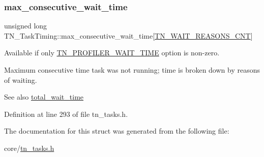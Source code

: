 \subsubsection{\texorpdfstring{max\+\_\+consecutive\+\_\+wait\+\_\+time}{max\_consecutive\_wait\_time}}
{\footnotesize\ttfamily unsigned long T\+N\+\_\+\+Task\+Timing\+::max\+\_\+consecutive\+\_\+wait\+\_\+time\mbox{[}\hyperlink{tn__tasks_8h_a343b0332013c15d6e878c2f60ed2c9b7a54de9b2b340a9d3f444aaeccda0764ea}{T\+N\+\_\+\+W\+A\+I\+T\+\_\+\+R\+E\+A\+S\+O\+N\+S\+\_\+\+C\+NT}\mbox{]}}



Available if only {\ttfamily \hyperlink{tn__cfg__default_8h_a1c04db5457adb54f7cc38d42b29a5ad7}{T\+N\+\_\+\+P\+R\+O\+F\+I\+L\+E\+R\+\_\+\+W\+A\+I\+T\+\_\+\+T\+I\+ME}} option is non-\/zero. 

Maximum consecutive time task was not running; time is broken down by reasons of waiting.

\begin{DoxySeeAlso}{See also}
{\ttfamily \hyperlink{structTN__TaskTiming_a0832c998c39b3e8400ccbb386bfbc7d9}{total\+\_\+wait\+\_\+time}} 
\end{DoxySeeAlso}


Definition at line 293 of file tn\+\_\+tasks.\+h.



The documentation for this struct was generated from the following file\+:\begin{DoxyCompactItemize}
\item 
core/\hyperlink{tn__tasks_8h}{tn\+\_\+tasks.\+h}\end{DoxyCompactItemize}
